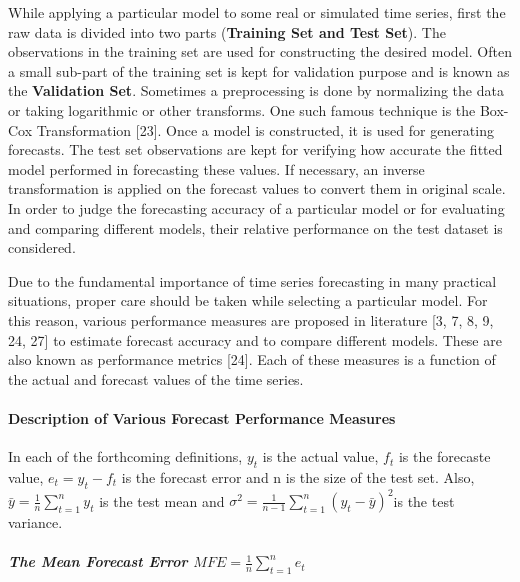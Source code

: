 \documentclass[
  onepage,
  openany]{scrbook}
\let\oldparagraph\paragraph
\renewcommand{\paragraph}[1]{\oldparagraph{#1}\mbox{}}
\let\oldsubparagraph\subparagraph
\renewcommand{\subparagraph}[1]{\oldsubparagraph{#1}\mbox{}}
\begin{document}
While applying a particular model to some real or simulated time series,
first the raw data is divided into two parts (\textbf{Training Set and
Test Set}). The observations in the training set are used for
constructing the desired model. Often a small sub-part of the training
set is kept for validation purpose and is known as the
\textbf{Validation Set}. Sometimes a preprocessing is done by
normalizing the data or taking logarithmic or other transforms. One such
famous technique is the Box-Cox Transformation {[}23{]}. Once a model is
constructed, it is used for generating forecasts. The test set
observations are kept for verifying how accurate the fitted model
performed in forecasting these values. If necessary, an inverse
transformation is applied on the forecast values to convert them in
original scale. In order to judge the forecasting accuracy of a
particular model or for evaluating and comparing different models, their
relative performance on the test dataset is considered.

Due to the fundamental importance of time series forecasting in many
practical situations, proper care should be taken while selecting a
particular model. For this reason, various performance measures are
proposed in literature {[}3, 7, 8, 9, 24, 27{]} to estimate forecast
accuracy and to compare different models. These are also known as
performance metrics {[}24{]}. Each of these measures is a function of
the actual and forecast values of the time series.

\hypertarget{description-of-various-forecast-performance-measures}{%
\paragraph{Description of Various Forecast Performance
Measures}\label{description-of-various-forecast-performance-measures}}

In each of the forthcoming definitions, \(y_{t }\) is the actual value,
\(f_{t}\) is the forecaste value, \(e_{t} = y_{t} - f_{t}\) is the
forecast error and n is the size of the test set. Also,
\(\displaystyle \bar{y} = \frac{1}{n}\sum_{t=1}^{n}y_{t}\) is the test
mean and
\(\displaystyle \sigma^{2} = \frac{1}{n-1}\sum_{t=1}^{n}(y_{t}-\bar{y})^{2}\)is
the test variance.

\hypertarget{the-mean-forecast-error-displaystyle-mfe-frac1nsum_t1ne_t}{%
\subparagraph{\texorpdfstring{\textbf{The Mean Forecast Error}
\(\displaystyle MFE = \frac{1}{n}\sum_{t=1}^{n}e_{t}\)}{The Mean Forecast Error \textbackslash displaystyle MFE = \textbackslash frac\{1\}\{n\}\textbackslash sum\_\{t=1\}\^{}\{n\}e\_\{t\}}}\label{the-mean-forecast-error-displaystyle-mfe-frac1nsum_t1ne_t}}
\end{document}
